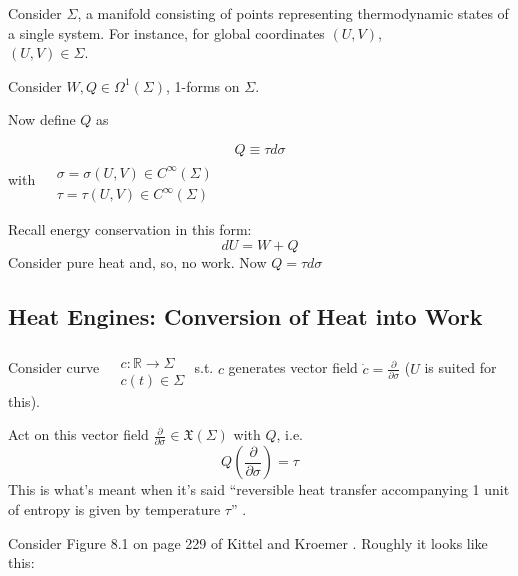 \documentclass[twoside]{amsart}
\theoremstyle{plain}
\theoremstyle{definition}
\begin{document}
Consider $\Sigma$, a manifold consisting of points representing thermodynamic states of a single system.  For instance, for global coordinates $(U,V)$, \\
$(U,V) \in \Sigma$.  

Consider $W,Q \in \Omega^1(\Sigma)$, 1-forms on $\Sigma$.  

Now define $Q$ as 

\[
Q \equiv \tau d\sigma
\]
with $\begin{aligned}
 & \quad \\
  & \sigma = \sigma(U,V) \in C^{\infty}(\Sigma) \\
   & \tau = \tau(U,V) \in C^{\infty}(\Sigma) \end{aligned}$

Recall energy conservation in this form:
\[
dU = W + Q
\]
Consider pure heat and, so, no work.  Now $Q = \tau d\sigma$ 

\subsection*{Heat Engines: Conversion of Heat into Work}

Consider curve $\begin{aligned} & \quad \\ 
  & c : \mathbb{R} \to \Sigma \\
  & c(t) \in \Sigma \end{aligned}$ s.t. $c$ generates vector field $\dot{c} = \frac{ \partial }{ \partial \sigma }$ ($U$ is suited for this).  

Act on this vector field $\frac{ \partial }{ \partial \sigma} \in \mathfrak{X}(\Sigma)$ with $Q$, i.e.
\[
Q \left( \frac{ \partial }{ \partial \sigma } \right) = \tau
\]
This is what's meant when it's said ``reversible heat transfer accompanying 1 unit of entropy is given by temperature $\tau$'' \cite{CKittelHKroemer1980}.  

Consider Figure 8.1 on page 229 of Kittel and Kroemer \cite{CKittelHKroemer1980}.  Roughly it looks like this:

\end{document}
